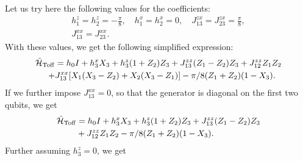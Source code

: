 Let us try here the following values for the coefficients:
\begin{equation}
\begin{gathered}
  h_1^z = h_2^z = -\frac{\pi}{8},\quad
  h_1^x = h_2^x = 0,
  \quad J_{13}^{zx} = J_{23}^{zx} = \frac{\pi}{8}, \\
  J_{13}^{xx} = J_{23}^{xx}.
\end{gathered}
\end{equation}
With these values, we get the following simplified expression:
\begin{equation}
\begin{aligned}
  \tilde{{\mathcal{H}}}_{\operatorname{Toff}} &= h_0 I + h_3^x X_3 + h_3^z(1+ Z_2)Z_3
  + J_{13}^{zz}(Z_1 - Z_2)Z_3 + J_{12}^{zz} Z_1 Z_2 \\
  + &J_{13}^{xx} [X_1(X_3 - Z_2) + X_2(X_3 - Z_1)]
  - \pi/8 ( Z_1 +  Z_2)(1 - X_3).
\end{aligned}
\end{equation}
If we further impose $J_{13}^{xx}=0$, so that the generator is diagonal on the first two qubits, we get
\begin{equation}
\begin{aligned}
    \tilde{{\mathcal{H}}}_{\operatorname{Toff}} &= h_0 I + h_3^x X_3 + h_3^z(1+ Z_2)Z_3
    + J_{13}^{zz}(Z_1 - Z_2)Z_3 \\
    &+ J_{12}^{zz} Z_1 Z_2 - \pi/8 (Z_1 +  Z_2)(1 - X_3).
\end{aligned}
\end{equation}
Further assuming $h_3^z=0$, we get
